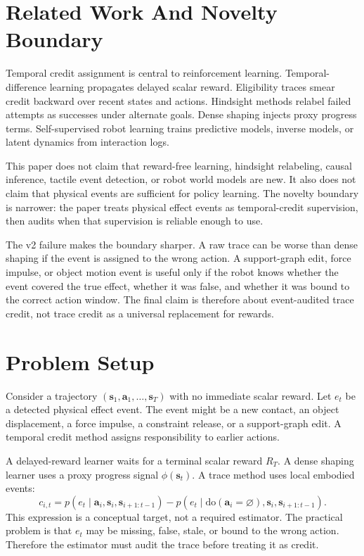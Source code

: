 \documentclass{article}
\newcommand{\states}{\mathbf{s}}
\newcommand{\actions}{\mathbf{a}}
\begin{document}
\section{Related Work And Novelty Boundary}

Temporal credit assignment is central to reinforcement learning. Temporal-difference learning propagates delayed scalar reward. Eligibility traces smear credit backward over recent states and actions. Hindsight methods relabel failed attempts as successes under alternate goals. Dense shaping injects proxy progress terms. Self-supervised robot learning trains predictive models, inverse models, or latent dynamics from interaction logs.

This paper does not claim that reward-free learning, hindsight relabeling, causal inference, tactile event detection, or robot world models are new. It also does not claim that physical events are sufficient for policy learning. The novelty boundary is narrower: the paper treats physical effect events as temporal-credit supervision, then audits when that supervision is reliable enough to use.

The v2 failure makes the boundary sharper. A raw trace can be worse than dense shaping if the event is assigned to the wrong action. A support-graph edit, force impulse, or object motion event is useful only if the robot knows whether the event covered the true effect, whether it was false, and whether it was bound to the correct action window. The final claim is therefore about event-audited trace credit, not trace credit as a universal replacement for rewards.

\section{Problem Setup}

Consider a trajectory $(\states_1,\actions_1,\ldots,\states_T)$ with no immediate scalar reward. Let $e_t$ be a detected physical effect event. The event might be a new contact, an object displacement, a force impulse, a constraint release, or a support-graph edit. A temporal credit method assigns responsibility to earlier actions.

A delayed-reward learner waits for a terminal scalar reward $R_T$. A dense shaping learner uses a proxy progress signal $\phi(\states_t)$. A trace method uses local embodied events:
\begin{equation}
    c_{i,t} =
    p(e_t \mid \actions_i,\states_i,\states_{i+1:t-1})
    -
    p(e_t \mid \mathrm{do}(\actions_i=\varnothing),\states_i,\states_{i+1:t-1}).
\end{equation}
This expression is a conceptual target, not a required estimator. The practical problem is that $e_t$ may be missing, false, stale, or bound to the wrong action. Therefore the estimator must audit the trace before treating it as credit.
\end{document}
